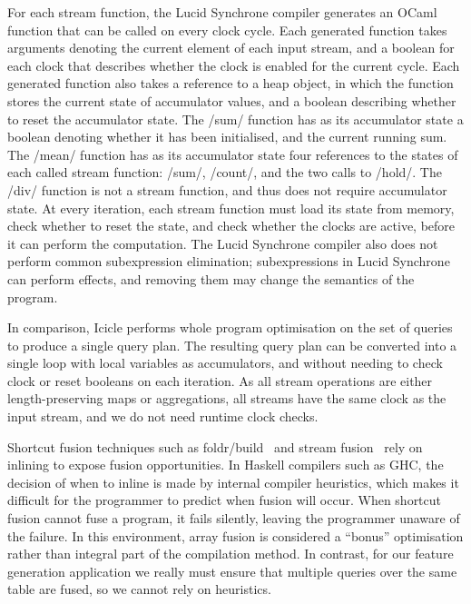 For each stream function, the Lucid Synchrone compiler generates an OCaml function that can be called on every clock cycle.
Each generated function takes arguments denoting the current element of each input stream, and a boolean for each clock that describes whether the clock is enabled for the current cycle.
Each generated function also takes a reference to a heap object, in which the function stores the current state of accumulator values, and a boolean describing whether to reset the accumulator state.
The \Lucy/sum/ function has as its accumulator state a boolean denoting whether it has been initialised, and the current running sum.
The \Lucy/mean/ function has as its accumulator state four references to the states of each called stream function: \Lucy/sum/, \Lucy/count/, and the two calls to \Lucy/hold/.
The \Lucy/div/ function is not a stream function, and thus does not require accumulator state.
At every iteration, each stream function must load its state from memory, check whether to reset the state, and check whether the clocks are active, before it can perform the computation.
The Lucid Synchrone compiler also does not perform common subexpression elimination; subexpressions in Lucid Synchrone can perform effects, and removing them may change the semantics of the program.

In comparison, Icicle performs whole program optimisation on the set of queries to produce a single query plan.
The resulting query plan can be converted into a single loop with local variables as accumulators, and without needing to check clock or reset booleans on each iteration.
As all stream operations are either length-preserving maps or aggregations, all streams have the same clock as the input stream, and we do not need runtime clock checks.

Shortcut fusion techniques such as foldr/build~\cite{gill1993short} and stream fusion~\cite{coutts2007stream} rely on inlining to expose fusion opportunities.
In Haskell compilers such as GHC, the decision of when to inline is made by internal compiler heuristics, which makes it difficult for the programmer to predict when fusion will occur.
When shortcut fusion cannot fuse a program, it fails silently, leaving the programmer unaware of the failure.
In this environment, array fusion is considered a ``bonus'' optimisation rather than integral part of the compilation method.
In contrast, for our feature generation application we really must ensure that multiple queries over the same table are fused, so we cannot rely on heuristics.

